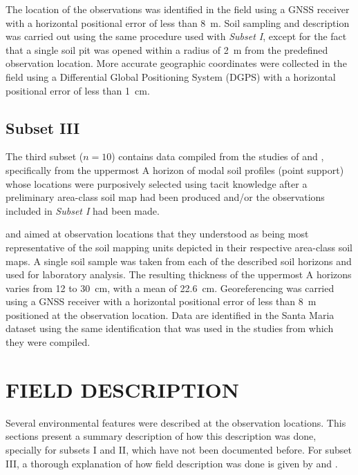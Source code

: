 The location of the observations was identified in the field using a GNSS receiver with a horizontal 
positional error of less than \SI{8}{\metre}. Soil sampling and description was carried out using the same 
procedure used with \emph{Subset I}, except for the fact that a single soil pit was opened within a radius of 
\SI{2}{\m} from the predefined observation location. More accurate geographic coordinates were collected in 
the field using a Differential Global Positioning System (DGPS) with a horizontal positional error of less 
than \SI{1}{\centi\metre}.

\subsection{Subset III}

The third subset ($n = 10$) contains data compiled from the studies of \citet{Pedron2005} and 
\citet{Miguel2010}, specifically from the uppermost A horizon of modal soil profiles (point support) whose 
locations were purposively selected using tacit knowledge after a preliminary area-class soil map had been 
produced and/or the observations included in \emph{Subset I} had been made.

\citet{Pedron2005} and \citet{Miguel2010} aimed at observation locations that they understood as being most 
representative of the soil mapping units depicted in their respective area-class soil maps. A single soil 
sample was taken from each of the described soil horizons and used for laboratory analysis. The resulting 
thickness of the uppermost A horizons varies from \num{12} to \SI{30}{\centi\metre}, with a mean of 
\SI{22.6}{\centi\metre}. Georeferencing was carried using a GNSS receiver with a horizontal positional error 
of less than \SI{8}{\metre} positioned at the observation location. Data are identified in the Santa Maria 
dataset using the same identification that was used in the studies from which they were compiled.

\section{FIELD DESCRIPTION}
\label{sec:chap04-field-description}

Several environmental features were described at the observation locations. This sections present a summary
description of how this description was done, specially for subsets I and II, which have not been documented 
before. For subset III, a thorough explanation of how field description was done is given by 
\citet{Pedron2005} and \citet{Miguel2010}.

